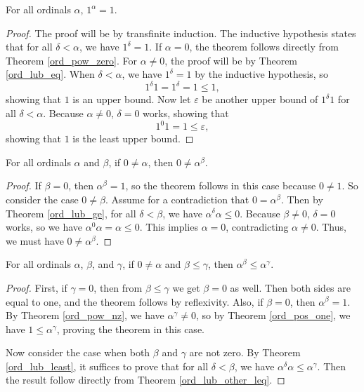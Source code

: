 \documentclass[../../math.tex]{subfiles}
\begin{document}
\begin{theorem} \label{one_ord_pow}
    For all ordinals $\alpha$, $1^\alpha = 1$.
\end{theorem}
\begin{proof}
    The proof will be by transfinite induction.  The inductive hypothesis states
    that for all $\delta < \alpha$, we have $1^\delta = 1$.  If $\alpha = 0$,
    the theorem follows directly from Theorem \ref{ord_pow_zero}.  For $\alpha
    \neq 0$, the proof will be by Theorem \ref{ord_lub_eq}.  When $\delta <
    \alpha$, we have $1^\delta = 1$ by the inductive hypothesis, so
    \[
        1^\delta 1 = 1^\delta = 1 \leq 1,
    \]
    showing that $1$ is an upper bound.  Now let $\varepsilon$ be another upper
    bound of $1^\delta 1$ for all $\delta < \alpha$.  Because $\alpha \neq 0$,
    $\delta = 0$ works, showing that
    \[
        1^0 1 = 1 \leq \varepsilon,
    \]
    showing that $1$ is the least upper bound.
\end{proof}

\begin{theorem} \label{ord_pow_nz}
    For all ordinals $\alpha$ and $\beta$, if $0 \neq \alpha$, then $0 \neq
    \alpha^\beta$.
\end{theorem}
\begin{proof}
    If $\beta = 0$, then $\alpha ^ \beta = 1$, so the theorem follows in this
    case because $0 \neq 1$.  So consider the case $0 \neq \beta$.  Assume for a
    contradiction that $0 = \alpha ^ \beta$.  Then by Theorem \ref{ord_lub_ge},
    for all $\delta < \beta$, we have $\alpha^\delta \alpha \leq 0$.  Because
    $\beta \neq 0$, $\delta = 0$ works, so we have $\alpha^0 \alpha = \alpha
    \leq 0$.  This implies $\alpha = 0$, contradicting $\alpha \neq 0$.  Thus,
    we must have $0 \neq \alpha ^ \beta$.
\end{proof}

\begin{theorem} \label{ord_pow_le}
    For all ordinals $\alpha$, $\beta$, and $\gamma$, if $0 \neq \alpha$ and
    $\beta \leq \gamma$, then $\alpha ^ \beta \leq \alpha ^ \gamma$.
\end{theorem}
\begin{proof}
    First, if $\gamma = 0$, then from $\beta \leq \gamma$ we get $\beta = 0$ as
    well.  Then both sides are equal to one, and the theorem follows by
    reflexivity.  Also, if $\beta = 0$, then $\alpha ^ \beta = 1$.  By Theorem
    \ref{ord_pow_nz}, we have $\alpha ^ \gamma \neq 0$, so by Theorem
    \ref{ord_pos_one}, we have $1 \leq \alpha ^ \gamma$, proving the theorem in
    this case.

    Now consider the case when both $\beta$ and $\gamma$ are not zero.  By
    Theorem \ref{ord_lub_least}, it suffices to prove that for all $\delta <
    \beta$, we have $\alpha^\delta \alpha \leq \alpha ^ \gamma$.  Then the
    result follow directly from Theorem \ref{ord_lub_other_leq}.
\end{proof}
\end{document}
